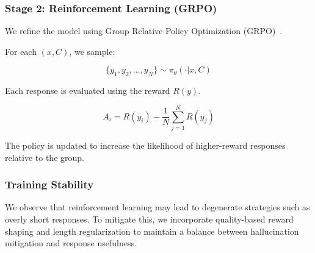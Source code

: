 \subsubsection{Stage 2: Reinforcement Learning (GRPO)}

We refine the model using Group Relative Policy Optimization (GRPO)~\cite{GRPO}.

For each $(x, C)$, we sample:

\[
\{y_1, y_2, \dots, y_N\} \sim \pi_{\theta}(\cdot | x, C)
\]

Each response is evaluated using the reward $R(y)$.

\[
A_i = R(y_i) - \frac{1}{N} \sum_{j=1}^{N} R(y_j)
\]

The policy is updated to increase the likelihood of higher-reward responses relative to the group.

\subsubsection{Training Stability}

We observe that reinforcement learning may lead to degenerate strategies such as overly short responses. 
To mitigate this, we incorporate quality-based reward shaping and length regularization to maintain a balance between hallucination mitigation and response usefulness.